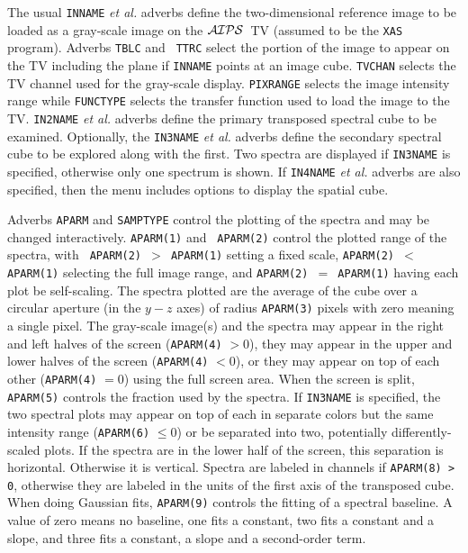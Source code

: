 \documentclass[twoside]{article}
\newcommand{\Me}[1]{\textcolor{mecol}{#1}}
\newcommand{\AIPS}{{$\cal AIPS\/$}}
\begin{document}
The usual {\tt INNAME} {\it et al.} adverbs define the two-dimensional
reference image to be loaded as a gray-scale image on the \AIPS\ TV
(assumed to be the {\tt XAS} program).  Adverbs {\tt TBLC} and {\tt
  TTRC} select the portion of the image to appear on the TV including
the plane if {\tt INNAME} points at an image cube.  {\tt TVCHAN}
selects the TV channel used for the gray-scale display. {\tt PIXRANGE}
selects the image intensity range while {\tt FUNCTYPE} selects the
transfer function used to load the image to the TV\@.  {\tt IN2NAME}
{\it et al.} adverbs define the primary transposed spectral cube to be
examined.  Optionally, the {\tt IN3NAME} {\it et al.} adverbs define
the secondary spectral cube to be explored along with the first.  Two
spectra are displayed if {\tt IN3NAME} is specified, otherwise only
one spectrum is shown.  \Me{If {\tt IN4NAME} {\it et al.} adverbs are
also specified, then the menu includes options to display the spatial
cube.}

Adverbs {\tt APARM} and {\tt SAMPTYPE} control the plotting of the
spectra and may be changed interactively.  {\tt APARM(1)} and {\tt
  APARM(2)} control the plotted range of the spectra, with {\tt
  APARM(2) $>$ APARM(1)} setting a fixed scale, {\tt APARM(2) $<$
  APARM(1)} selecting the full image range, and {\tt APARM(2) $=$
  APARM(1)} having each plot be self-scaling.  The spectra plotted are
the average of the cube over a circular aperture (in the $y-z$ axes)
of radius {\tt APARM(3)} pixels with zero meaning a single pixel.  The
gray-scale image(s) and the spectra may appear in the right and left
halves of the screen ({\tt APARM(4)} $> 0$), they may appear in the
upper and lower halves of the screen ({\tt APARM(4)} $< 0$), or they
may appear on top of each other ({\tt APARM(4)} $= 0$) using the full
screen area.  When the screen is split, {\tt APARM(5)} controls the
fraction used by the spectra.  If {\tt IN3NAME} is specified, the two
spectral plots may appear on top of each in separate colors but the
same intensity range ({\tt APARM(6)} $\leq 0$) or be separated into
two, potentially differently-scaled plots.  If the spectra are in the
lower half of the screen, this separation is horizontal.  Otherwise it
is vertical.  Spectra are labeled in channels if {\tt APARM(8) > 0},
otherwise they are labeled in the units of the first axis of the
transposed cube.  When doing Gaussian fits, {\tt APARM(9)} controls
the fitting of a spectral baseline.  A value of zero means no
baseline, one fits a constant, two fits a constant and a slope, and
three fits a constant, a slope and a second-order term.
\end{document}
